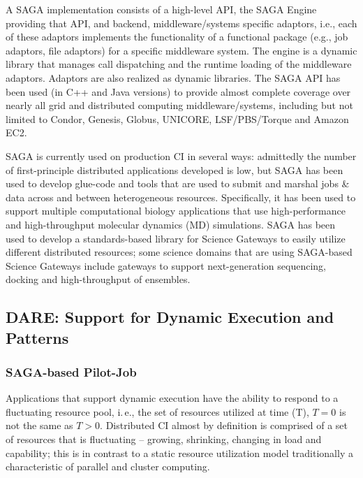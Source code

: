 \documentclass[]{svjour3}
\begin{document}
A SAGA implementation consists of a high-level API, the SAGA
Engine providing that API, and backend, middleware/systems specific
adaptors, i.e., each of these adaptors implements the functionality of
a functional package (e.g., job adaptors, file adaptors) for a
specific middleware system. The engine is a dynamic library that
manages call dispatching and the runtime loading of the middleware
adaptors. Adaptors are also realized as dynamic libraries. The SAGA
API has been used (in C++ and Java versions) to provide almost
complete coverage over nearly all grid and distributed computing
middleware/systems, including but not limited to Condor, Genesis,
Globus, UNICORE, LSF/PBS/Torque and Amazon EC2.

SAGA is currently used on production CI in several ways: admittedly
the number of first-principle distributed applications developed is
low, but SAGA has been used to develop glue-code and tools that are
used to submit and marshal jobs \& data across and between
heterogeneous resources. Specifically, it has been used to support
multiple computational biology applications that use high-performance
and high-throughput molecular dynamics (MD) simulations. SAGA has been
used to develop a standards-based library for Science Gateways to
easily utilize different distributed resources; some science domains
that are using SAGA-based Science Gateways include gateways to support
next-generation sequencing, docking and high-throughput of ensembles.

\subsection{DARE: Support for Dynamic Execution and Patterns}


\subsubsection{SAGA-based Pilot-Job}

Applications that support dynamic execution have the ability to
respond to a fluctuating resource pool, i.\,e., the set of resources
utilized at time (T), $T=0$ is not the same as $T>0$. Distributed CI
almost by definition is comprised of a set of resources that is
fluctuating -- growing, shrinking, changing in load and capability;
this is in contrast to a static resource utilization model
traditionally a characteristic of parallel and cluster computing.
\end{document}
